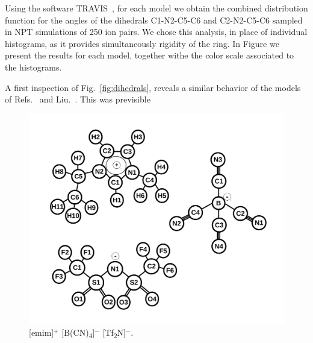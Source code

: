 \documentclass[3p,twocolumn]{elsarticle}
\begin{document}
Using the software TRAVIS~\cite{Brehm_2011}, for each model we obtain the combined distribution function for the angles of the dihedrals C1-N2-C5-C6 and C2-N2-C5-C6 sampled in NPT simulations of 250 ion pairs. We chose this analysis, in place of individual histograms, as it provides simultaneously rigidity of the ring. In Figure we present the results for each model, together withe the color scale associated to the histograms.

A first inspection of Fig.~\ref{fig:dihedrals}, reveals a similar behavior of the models of Refs.~\cite{Koller_2012} and Liu.~\cite{Liu_2014}. This was previsible 

\begin{figure}
\centering
\includegraphics[width=\linewidth]{ions_paper.pdf}
\caption{[emim]$^{+}$ [B(CN)\textsubscript{4}]$^{-}$ [Tf\textsubscript{2}N]$^{-}$.}
\label{fig:atoms_name}
\end{figure}

%

%
\end{document}
